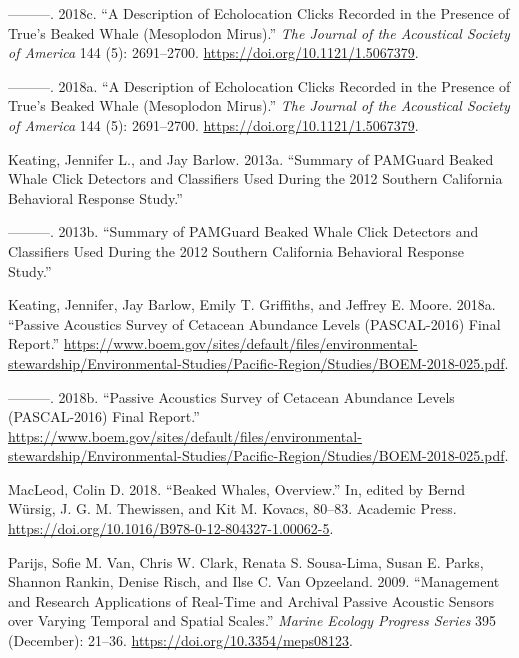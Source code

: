 \documentclass[
  letterpaper,
  DIV=11,
  numbers=noendperiod]{scrartcl}
\newlength{\cslhangindent}
\newlength{\cslentryspacingunit} %
\newenvironment{CSLReferences}[2] %
 {%
  \setlength{\parindent}{0pt}
  \ifodd #1
  \let\oldpar\par
  \def\par{\hangindent=\cslhangindent\oldpar}
  \fi
  \setlength{\parskip}{#2\cslentryspacingunit}
 }%
 {}
\begin{document}
\begin{CSLReferences}{1}{0}
\leavevmode{}%
---------. 2018c. {``A Description of Echolocation Clicks Recorded in
the Presence of True's Beaked Whale (Mesoplodon Mirus).''} \emph{The
Journal of the Acoustical Society of America} 144 (5): 2691--2700.
\url{https://doi.org/10.1121/1.5067379}.

\leavevmode{}%
---------. 2018a. {``A Description of Echolocation Clicks Recorded in
the Presence of True's Beaked Whale (Mesoplodon Mirus).''} \emph{The
Journal of the Acoustical Society of America} 144 (5): 2691--2700.
\url{https://doi.org/10.1121/1.5067379}.

\leavevmode{}%
Keating, Jennifer L., and Jay Barlow. 2013a. {``Summary of PAMGuard
Beaked Whale Click Detectors and Classifiers Used During the 2012
Southern California Behavioral Response Study.''}

\leavevmode{}%
---------. 2013b. {``Summary of PAMGuard Beaked Whale Click Detectors
and Classifiers Used During the 2012 Southern California Behavioral
Response Study.''}

\leavevmode{}%
Keating, Jennifer, Jay Barlow, Emily T. Griffiths, and Jeffrey E. Moore.
2018a. {``Passive Acoustics Survey of Cetacean Abundance Levels
(PASCAL-2016) Final Report.''}
\url{https://www.boem.gov/sites/default/files/environmental-stewardship/Environmental-Studies/Pacific-Region/Studies/BOEM-2018-025.pdf}.

\leavevmode{}%
---------. 2018b. {``Passive Acoustics Survey of Cetacean Abundance
Levels (PASCAL-2016) Final Report.''}
\url{https://www.boem.gov/sites/default/files/environmental-stewardship/Environmental-Studies/Pacific-Region/Studies/BOEM-2018-025.pdf}.

\leavevmode{}%
MacLeod, Colin D. 2018. {``Beaked Whales, Overview.''} In, edited by
Bernd Würsig, J. G. M. Thewissen, and Kit M. Kovacs, 80--83. Academic
Press. \url{https://doi.org/10.1016/B978-0-12-804327-1.00062-5}.

\leavevmode{}%
Parijs, Sofie M. Van, Chris W. Clark, Renata S. Sousa-Lima, Susan E.
Parks, Shannon Rankin, Denise Risch, and Ilse C. Van Opzeeland. 2009.
{``Management and Research Applications of Real-Time and Archival
Passive Acoustic Sensors over Varying Temporal and Spatial Scales.''}
\emph{Marine Ecology Progress Series} 395 (December): 21--36.
\url{https://doi.org/10.3354/meps08123}.


\end{CSLReferences}
\end{document}
